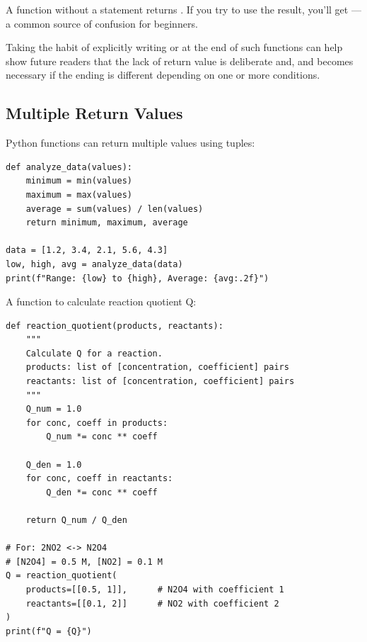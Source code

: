 \begin{note}
A function without a  statement returns . If you try to use the result, you'll get ---a common source of confusion for beginners.
\end{note}

\begin{tip}
Taking the habit of explicitly writing  or  at the end of such functions can help show future readers that the lack of return value is deliberate and, and becomes necessary if the ending is different depending on one or more conditions.
\end{tip}

\subsection{Multiple Return Values}

Python functions can return multiple values using tuples:

\begin{lstlisting}
def analyze_data(values):
    minimum = min(values)
    maximum = max(values)
    average = sum(values) / len(values)
    return minimum, maximum, average

data = [1.2, 3.4, 2.1, 5.6, 4.3]
low, high, avg = analyze_data(data)
print(f"Range: {low} to {high}, Average: {avg:.2f}")
\end{lstlisting}

\begin{labexample}
A function to calculate reaction quotient Q:

\begin{lstlisting}
def reaction_quotient(products, reactants):
    """
    Calculate Q for a reaction.
    products: list of [concentration, coefficient] pairs
    reactants: list of [concentration, coefficient] pairs
    """
    Q_num = 1.0
    for conc, coeff in products:
        Q_num *= conc ** coeff

    Q_den = 1.0
    for conc, coeff in reactants:
        Q_den *= conc ** coeff

    return Q_num / Q_den

# For: 2NO2 <-> N2O4
# [N2O4] = 0.5 M, [NO2] = 0.1 M
Q = reaction_quotient(
    products=[[0.5, 1]],      # N2O4 with coefficient 1
    reactants=[[0.1, 2]]      # NO2 with coefficient 2
)
print(f"Q = {Q}")
\end{lstlisting}
\end{labexample}

